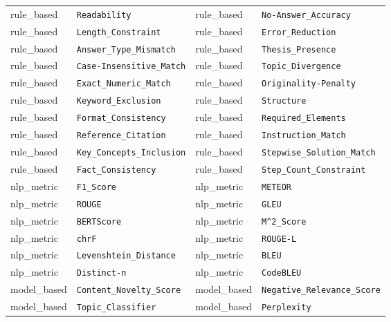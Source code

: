 {\begin{longtable}{|l|l|l|l|}
rule\_based & \texttt{Readability} & rule\_based & \texttt{No-Answer\_Accuracy} \\
rule\_based & \texttt{Length\_Constraint} & rule\_based & \texttt{Error\_Reduction} \\
rule\_based & \texttt{Answer\_Type\_Mismatch} & rule\_based & \texttt{Thesis\_Presence} \\
rule\_based & \texttt{Case-Insensitive\_Match} & rule\_based & \texttt{Topic\_Divergence} \\
rule\_based & \texttt{Exact\_Numeric\_Match} & rule\_based & \texttt{Originality-Penalty} \\
rule\_based & \texttt{Keyword\_Exclusion} & rule\_based & \texttt{Structure} \\
rule\_based & \texttt{Format\_Consistency} & rule\_based & \texttt{Required\_Elements} \\
rule\_based & \texttt{Reference\_Citation} & rule\_based & \texttt{Instruction\_Match} \\
rule\_based & \texttt{Key\_Concepts\_Inclusion} & rule\_based & \texttt{Stepwise\_Solution\_Match} \\
rule\_based & \texttt{Fact\_Consistency} & rule\_based & \texttt{Step\_Count\_Constraint} \\
nlp\_metric & \texttt{F1\_Score} & nlp\_metric & \texttt{METEOR} \\
nlp\_metric & \texttt{ROUGE} & nlp\_metric & \texttt{GLEU} \\
nlp\_metric & \texttt{BERTScore} & nlp\_metric & \texttt{M\^{}2\_Score} \\
nlp\_metric & \texttt{chrF} & nlp\_metric & \texttt{ROUGE-L} \\
nlp\_metric & \texttt{Levenshtein\_Distance} & nlp\_metric & \texttt{BLEU} \\
nlp\_metric & \texttt{Distinct-n} & nlp\_metric & \texttt{CodeBLEU} \\
model\_based & \texttt{Content\_Novelty\_Score} & model\_based & \texttt{Negative\_Relevance\_Score} \\
model\_based & \texttt{Topic\_Classifier} & model\_based & \texttt{Perplexity} \\
\hline
\end{longtable}}

\clearpage





